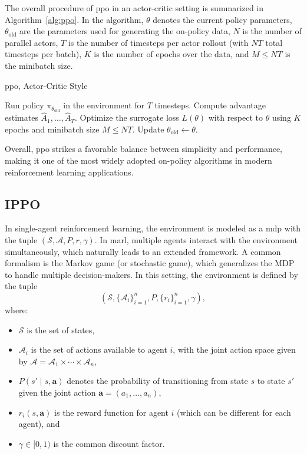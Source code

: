 The overall procedure of \gls{ppo} in an actor-critic setting is summarized in Algorithm~\ref{alg:ppo}. In the algorithm, \(\theta\) denotes the current policy parameters, \(\theta_{\text{old}}\) are the parameters used for generating the on-policy data, \(N\) is the number of parallel actors, \(T\) is the number of timesteps per actor rollout (with \(NT\) total timesteps per batch), \(K\) is the number of epochs over the data, and \(M \le NT\) is the minibatch size.


\begin{algorithm}[H]
\caption{\gls{ppo}, Actor-Critic Style}
\label{alg:ppo}
\begin{algorithmic}[1]
        \State Run policy \(\pi_{\theta_{\text{old}}}\) in the environment for \(T\) timesteps.
        \State Compute advantage estimates \(\hat{A}_1, \dots, \hat{A}_T\).
    \EndFor
    \State Optimize the surrogate loss \(L(\theta)\) with respect to \(\theta\) using \(K\) epochs and minibatch size \(M \le NT\).
    \State Update \(\theta_{\text{old}} \leftarrow \theta\).
\EndFor
\end{algorithmic}
\end{algorithm}

Overall, \gls{ppo} strikes a favorable balance between simplicity and performance, making it one of the most widely adopted on-policy algorithms in modern reinforcement learning applications.
\subsection{IPPO}
In single-agent reinforcement learning, the environment is modeled as a \gls{mdp} with the tuple \((\mathcal{S}, \mathcal{A}, P, r, \gamma)\). In \gls{marl}, multiple agents interact with the environment simultaneously, which naturally leads to an extended framework. A common formalism is the Markov game (or stochastic game), which generalizes the MDP to handle multiple decision-makers. In this setting, the environment is defined by the tuple
\[
(\mathcal{S}, \{\mathcal{A}_i\}_{i=1}^n, P, \{r_i\}_{i=1}^n, \gamma),
\]
where:
\begin{itemize}
    \item \(\mathcal{S}\) is the set of states,
    \item \(\mathcal{A}_i\) is the set of actions available to agent \(i\), with the joint action space given by \(\mathcal{A} = \mathcal{A}_1 \times \cdots \times \mathcal{A}_n\),
    \item \(P(s' \mid s, \mathbf{a})\) denotes the probability of transitioning from state \(s\) to state \(s'\) given the joint action \(\mathbf{a} = (a_1, \dots, a_n)\),
    \item \(r_i(s, \mathbf{a})\) is the reward function for agent \(i\) (which can be different for each agent), and
    \item \(\gamma \in [0,1)\) is the common discount factor.
\end{itemize}

